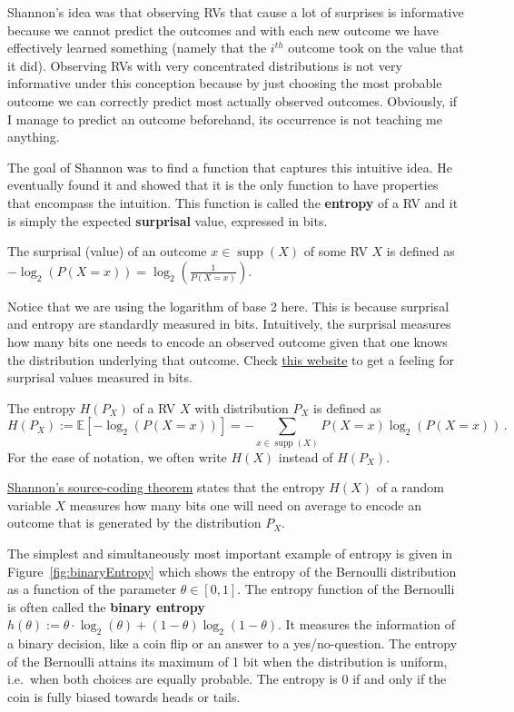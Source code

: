 \documentclass[a4paper,11pt,leqno]{report}\usepackage[]{graphicx}\usepackage[]{color}
\newcommand{\supp}{\operatorname{supp}}
\newcommand{\E}{\mathbb{E}}
\begin{document}
Shannon's idea was that observing RVs that cause a lot of surprises is informative because we cannot predict the outcomes and with each new outcome we have effectively learned something (namely that the $ i^{th} $ outcome took on the value that it did). Observing RVs with very concentrated distributions is not very informative under this conception because by just choosing the most probable outcome we can correctly predict most actually observed outcomes. Obviously, if I manage to predict an outcome beforehand, its occurrence is not teaching me anything.

The goal of Shannon was to find a function that captures this intuitive idea. He eventually found it and showed that it is the only function to have properties that encompass the intuition. This function is called the \textbf{entropy} of a RV and it is simply the expected \textbf{surprisal} value, expressed in bits.

\begin{Definition}[Surprisal]
The surprisal (value) of an outcome $ x \in \supp(X) $ of some RV $ X
$ is defined as $ -\log_{2}(P(X=x)) = \log_2(\frac{1}{P(X=x)})$.
\end{Definition} 

Notice that we are using the logarithm of base 2 here. This is because surprisal and entropy are standardly measured in bits. Intuitively, the surprisal measures how many bits one needs to encode an observed outcome given that one knows the distribution underlying that outcome. Check \href{http://www.umsl.edu/~fraundorfp/egsurpriNOLOGS.html}{this website} to get a feeling for surprisal values measured in bits.

\begin{Definition}[Entropy]
The entropy $H(P_X)$ of a RV $ X $ with distribution $P_X$ is defined as 
$$H(P_X) := \E[-\log_{2}(P(X=x))] = - \!\! \sum_{x \in \supp(X)} P(X=x) \log_2(P(X=x)) \, .$$ 
For the ease of notation, we often write $H(X)$ instead of $H(P_X)$.
\end{Definition}

\href{https://en.wikipedia.org/wiki/Shannon%27s_source_coding_theorem}{Shannon's source-coding theorem} states that the entropy $H(X)$ of a random variable $X$ measures how many bits one will need on average to encode an outcome that is generated by the distribution $ P_{X} $.

The simplest and simultaneously most important example of entropy is given in Figure~\ref{fig:binaryEntropy} which shows the entropy of the Bernoulli distribution as a function of the parameter $ \theta \in [0,1]$. The entropy function of the Bernoulli is often called the \textbf{binary entropy} $h(\theta) := \theta \cdot \log_2(\theta) + (1-\theta) \log_2(1-\theta)$. It measures the information of a binary decision, like a coin flip or an answer to a yes/no-question.
The entropy of the Bernoulli attains its maximum of 1 bit when the distribution is uniform, i.e.\ when both choices are equally 
probable. The entropy is 0 if and only if the coin is fully biased towards heads or tails.
\end{document}
